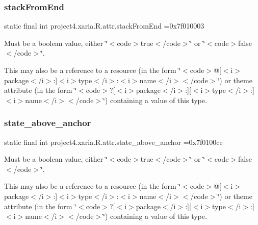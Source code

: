 \subsubsection{\texorpdfstring{stack\+From\+End}{stackFromEnd}}
{\footnotesize\ttfamily static final int project4.\+xaria.\+R.\+attr.\+stack\+From\+End =0x7f010003\hspace{0.3cm}{\ttfamily [static]}}

Must be a boolean value, either \char`\"{}$<$code$>$true$<$/code$>$\char`\"{} or \char`\"{}$<$code$>$false$<$/code$>$\char`\"{}. 

This may also be a reference to a resource (in the form \char`\"{}$<$code$>$@\mbox{[}$<$i$>$package$<$/i$>$\+:\mbox{]}$<$i$>$type$<$/i$>$\+:$<$i$>$name$<$/i$>$$<$/code$>$\char`\"{}) or theme attribute (in the form \char`\"{}$<$code$>$?\mbox{[}$<$i$>$package$<$/i$>$\+:\mbox{]}\mbox{[}$<$i$>$type$<$/i$>$\+:\mbox{]}$<$i$>$name$<$/i$>$$<$/code$>$\char`\"{}) containing a value of this type. \mbox{\label{classproject4_1_1xaria_1_1R_1_1attr_aafca5c6e6c806873aac364507cc7dee5}} 
\subsubsection{\texorpdfstring{state\+\_\+above\+\_\+anchor}{state\_above\_anchor}}
{\footnotesize\ttfamily static final int project4.\+xaria.\+R.\+attr.\+state\+\_\+above\+\_\+anchor =0x7f0100ce\hspace{0.3cm}{\ttfamily [static]}}

Must be a boolean value, either \char`\"{}$<$code$>$true$<$/code$>$\char`\"{} or \char`\"{}$<$code$>$false$<$/code$>$\char`\"{}. 

This may also be a reference to a resource (in the form \char`\"{}$<$code$>$@\mbox{[}$<$i$>$package$<$/i$>$\+:\mbox{]}$<$i$>$type$<$/i$>$\+:$<$i$>$name$<$/i$>$$<$/code$>$\char`\"{}) or theme attribute (in the form \char`\"{}$<$code$>$?\mbox{[}$<$i$>$package$<$/i$>$\+:\mbox{]}\mbox{[}$<$i$>$type$<$/i$>$\+:\mbox{]}$<$i$>$name$<$/i$>$$<$/code$>$\char`\"{}) containing a value of this type. \mbox{\label{classproject4_1_1xaria_1_1R_1_1attr_a260e6049b07e1460374b1f0531f5b159}} 
